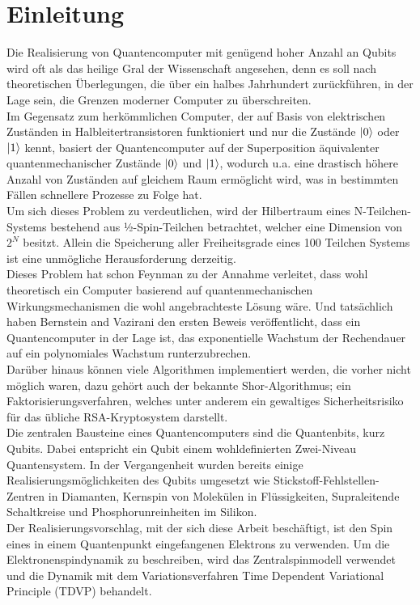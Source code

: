 \chapter{Einleitung}
Die Realisierung von Quantencomputer mit genügend hoher Anzahl an Qubits wird oft als das \glqq heilige Gral der Wissenschaft\grqq{} angesehen, denn 
es soll nach theoretischen Überlegungen, die über ein halbes Jahrhundert zurückführen, in der Lage sein, die Grenzen moderner Computer zu 
überschreiten. \\
Im Gegensatz zum herkömmlichen Computer, der auf Basis von elektrischen Zuständen in Halbleitertransistoren funktioniert 
und nur die Zustände $\ket{0}$ oder $\ket{1}$ kennt, basiert der Quantencomputer auf der Superposition äquivalenter 
quantenmechanischer Zustände $\ket{0}$ und $\ket{1}$, wodurch u.a. eine drastisch höhere Anzahl von Zuständen auf gleichem Raum ermöglicht 
wird, was in bestimmten Fällen schnellere Prozesse zu Folge hat.\\
Um sich dieses Problem zu verdeutlichen, wird der Hilbertraum eines N-Teilchen-Systems bestehend aus ½-Spin-Teilchen betrachtet, welcher eine 
Dimension von $2^N$ besitzt. Allein die Speicherung aller Freiheitsgrade eines 100 Teilchen Systems ist eine unmögliche Herausforderung
derzeitig. \\
Dieses Problem hat schon Feynman zu der Annahme verleitet, dass wohl theoretisch ein Computer basierend 
auf quantenmechanischen Wirkungsmechanismen die wohl angebrachteste Lösung wäre. Und tatsächlich haben Bernstein and Vazirani 
den ersten Beweis veröffentlicht, dass ein Quantencomputer in der Lage ist, das exponentielle Wachstum der Rechendauer auf ein 
polynomiales Wachstum runterzubrechen\cite{10.1145/167088.167097}.\\
Darüber hinaus können viele Algorithmen implementiert werden, die vorher nicht möglich waren, dazu gehört auch der bekannte Shor-Algorithmus; 
ein Faktorisierungsverfahren, welches unter anderem ein gewaltiges Sicherheitsrisiko für das übliche RSA-Kryptosystem darstellt\cite{365700,10.1137/S0097539795293172}.\\

\noindent Die zentralen Bausteine eines Quantencomputers sind die Quantenbits, kurz Qubits. Dabei entspricht ein Qubit einem wohldefinierten
Zwei-Niveau Quantensystem. In der Vergangenheit wurden bereits einige Realisierungsmöglichkeiten des Qubits umgesetzt wie Stickstoff-Fehlstellen-Zentren 
in Diamanten\cite{PhysRevLett.93.130501,Hanson2008-tn}, Kernspin von Molekülen in Flüssigkeiten\cite{RevModPhys.76.1037},
Supraleitende Schaltkreise\cite{RevModPhys.73.357} und Phosphorunreinheiten im Silikon\cite{Kane1998-pc}.\\
Der Realisierungsvorschlag, mit der sich diese Arbeit beschäftigt, ist den Spin eines in einem Quantenpunkt eingefangenen 
Elektrons zu verwenden\cite{Elzerman2004-wu,Bonadeo1998-nr,PMID:17901328,Fokina_2010,Spatzek2011-rn}. Um die Elektronenspindynamik zu beschreiben, wird 
das Zentralspinmodell verwendet und die Dynamik mit dem Variationsverfahren \glqq Time Dependent Variational Principle\grqq{} (TDVP) behandelt.\\

